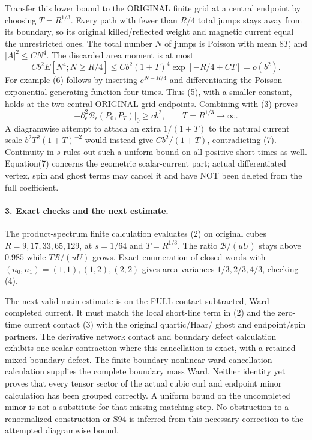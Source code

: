\documentclass[11pt]{article}
\begin{document}
Transfer this lower bound to the ORIGINAL finite grid at a central
endpoint by choosing $T=R^{1/3}$. Every path with fewer than $R/4$ total
jumps stays away from its boundary, so its original killed/reflected
weight and magnetic current equal the unrestricted ones. The total
number $N$ of jumps is Poisson with mean $8T$, and $|A|^2\le CN^4$.
The discarded area moment is at most
\[
 Cb^2E[N^4;N\ge R/4]
 \le Cb^2(1+T)^4\exp[-R/4+CT]=o(b^2).                            \tag{6}
\]
For example (6) follows by inserting $e^{N-R/4}$ and differentiating the
Poisson exponential generating function four times. Thus (5), with a
smaller constant, holds at the two central ORIGINAL-grid endpoints.
Combining with (3) proves
\[
 -\partial_\epsilon^2\mathcal B_\epsilon(P_0,P_T)\big|_0
       \ge cb^2,\qquad T=R^{1/3}\longrightarrow\infty.            \tag{7}
\]
A diagramwise attempt to attach an extra $1/(1+T)$ to the natural
current scale $b^2T^2(1+T)^{-2}$ would instead give $Cb^2/(1+T)$,
contradicting (7). Continuity in $s$ rules out such a uniform bound on
all positive short times as well. Equation(7) concerns the geometric
scalar-current part; actual differentiated vertex, spin and ghost terms
may cancel it and have NOT been deleted from the full coefficient.

\paragraph{3. Exact checks and the next estimate.}
The product-spectrum finite calculation evaluates (2) on original cubes
$R=9,17,33,65,129$, at $s=1/64$ and $T=R^{1/3}$.
The ratio $\mathcal B/(uU)$ stays above $0.985$ while
$T\mathcal B/(uU)$ grows. Exact enumeration of closed words with
$(n_0,n_1)=(1,1),(1,2),(2,2)$ gives area variances
$1/3,2/3,4/3$, checking (4).

The next valid main estimate is on the FULL contact-subtracted,
Ward-completed current. It must match the local short-line term in (2)
and the zero-time current contact (3) with the original quartic/Haar/
ghost and endpoint/spin partners. The derivative network contact and boundary defect calculation exhibits one scalar
contraction where this cancellation is exact, with a retained mixed
boundary defect. The finite boundary nonlinear ward cancellation calculation supplies the complete boundary mass Ward.
Neither identity yet proves that every tensor sector of the actual cubic curl and endpoint minor calculation has
been grouped correctly. A uniform bound on the uncompleted minor is
not a substitute for that missing matching step.
No obstruction to a renormalized construction or S94 is inferred from
this necessary correction to the attempted diagramwise bound.
\end{document}
